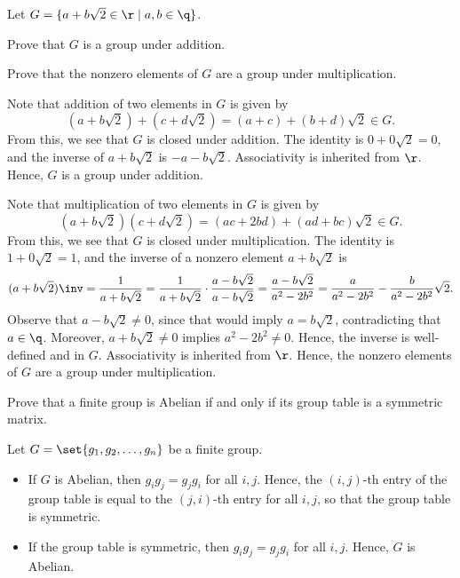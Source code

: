 \begin{specialexercise}\label{ex1.1.9}
    Let $G = \{ a + b\sqrt{2} \in \r \mid a, b \in \q \}$.
    \begin{subproblems}
        \item Prove that $G$ is a group under addition.
        \item Prove that the nonzero elements of $G$ are a group under multiplication.
        
    \end{subproblems}
\end{specialexercise}

\begin{solalph}
    \item Note that addition of two elements in $G$ is given by
    \[(a + b\sqrt 2) + (c + d\sqrt 2) = (a + c) + (b + d)\sqrt 2 \in G.\]
    From this, we see that $G$ is closed under addition. The identity is $0 + 0\sqrt 2 = 0$, and the inverse of $a + b\sqrt 2$ is $-a - b\sqrt 2$. Associativity is inherited from $\r$. Hence, $G$ is a group under addition.
    \item Note that multiplication of two elements in $G$ is given by
    \[(a + b\sqrt 2)(c + d\sqrt 2) = (ac + 2bd) + (ad + bc)\sqrt 2 \in G.\]
    From this, we see that $G$ is closed under multiplication. The identity is $1 + 0\sqrt 2 = 1$, and the inverse of a nonzero element $a + b\sqrt 2$ is
    \[(a + b\sqrt 2)\inv = \frac{1}{a + b\sqrt 2} = \frac{1}{a + b\sqrt 2} \cdot \frac{a - b\sqrt 2}{a - b\sqrt 2} = \frac{a - b\sqrt 2}{a^2 - 2b^2} = \frac a{a^2 - 2b^2} - \frac b{a^2 - 2b^2}\sqrt 2.\]
    Observe that $a - b\sqrt 2 \neq 0$, since that would imply $a = b\sqrt 2$, contradicting that $a \in \q$. Moreover, $a + b\sqrt 2 \neq 0$ implies $a^2 - 2b^2 \neq 0$. Hence, the inverse is well-defined and in $G$. Associativity is inherited from $\r$. Hence, the nonzero elements of $G$ are a group under multiplication.
\end{solalph}

\begin{exercise}\label{ex1.1.10}
    Prove that a finite group is Abelian if and only if its group table is a symmetric matrix.
\end{exercise}

\begin{sol}
    Let $G = \set{g_1, g_2, \ldots, g_n}$ be a finite group.
    \begin{itemize}
        \item [\rightimp] If $G$ is Abelian, then $g_i g_j = g_j g_i$ for all $i, j$. Hence, the $(i, j)$-th entry of the group table is equal to the $(j, i)$-th entry for all $i, j$, so that the group table is symmetric.
        \item [\leftimp] If the group table is symmetric, then $g_i g_j = g_j g_i$ for all $i, j$. Hence, $G$ is Abelian. \qh
    \end{itemize}
\end{sol}

